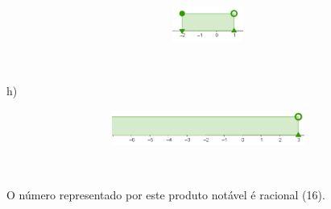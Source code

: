 \begin{respostas}{5}
\begin{figure}[H]
	\begin{Center}
		\includegraphics[width=4.38in,height=0.45in]{capitulos/conjuntos_numericos/media/image23.png}
	\end{Center}
\end{figure}

~~

 h)

\begin{figure}[H]
	\begin{Center}
		\includegraphics[width=4.38in,height=0.45in]{capitulos/conjuntos_numericos/media/image24.png}
	\end{Center}
\end{figure}

~~

\ansitem{} O número representado por este produto notável é racional (16).

\end{respostas}
